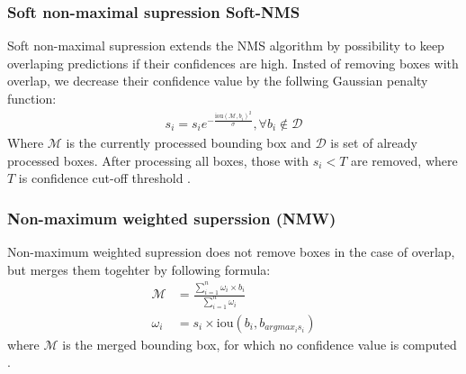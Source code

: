 \subsubsection{Soft non-maximal supression {Soft-NMS}}
Soft non-maximal supression extends the NMS algorithm by possibility to keep overlaping predictions if their confidences are high. Insted of removing boxes with overlap, we decrease their confidence value by the follwing Gaussian penalty function:
\begin{align}
    s_i = s_i e^{-\frac{\text{iou}\left( \mathcal{M}, b_i \right)^2}{\sigma}}, \forall b_i \notin \mathcal{D}
\end{align}
Where $\mathcal{M}$ is the currently processed bounding box and $\mathcal{D}$ is set of already processed boxes. After processing all boxes, those with $s_i < T$ are removed, where $T$ is confidence cut-off threshold \cite{Bodla2017}.

\subsubsection{Non-maximum weighted superssion (NMW)}
Non-maximum weighted supression does not remove boxes in the case of overlap, but merges them togehter by following formula:
\begin{align}
    \mathcal{M} & = \frac{\sum_{i=1}^n \omega_i \times b_i}{\sum_{i=1}^n \omega_i} \\
    \omega_i    & = s_i \times \text{iou} \left( b_i, b_{ argmax_i s_i} \right)
\end{align}
where $\mathcal{M}$ is the merged bounding box, for which no confidence value is computed \cite{Zhou2017,Solovyev2019}.

